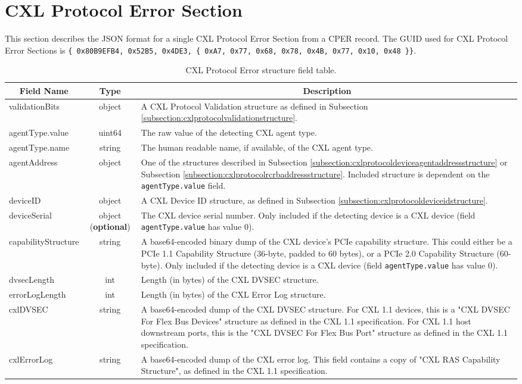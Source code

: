 \documentclass{report}
\newcommand*{\thead}[1]{\multicolumn{1}{|c|}{\bfseries #1}}
\newcommand*{\jsontable}[1]{
    \begin{table}[!ht]
    \label{#1}
    \centering
    \begin{adjustbox}{center}
    \begin{tabular}{|l|c|p{8cm}|}
    \hline
    \thead{Field Name} & \thead{Type} & \thead{Description} \\
    \hline
}
\newcommand*{\jsontableend}[1]{
    \hline
    \end{tabular}
    \end{adjustbox}
    \caption{#1}
    \label{table:#1}
    \end{table}
    \FloatBarrier
}
\begin{document}
\section{CXL Protocol Error Section}
\label{section:cxlprotocolerrorsection}
This section describes the JSON format for a single CXL Protocol Error Section from a CPER record. The GUID used for CXL Protocol Error Sections is \texttt{\{ 0x80B9EFB4, 0x52B5, 0x4DE3, \{ 0xA7, 0x77, 0x68, 0x78, 0x4B, 0x77, 0x10, 0x48 \}\}}.
\jsontable{table:cxlprotocolerrorsection}
validationBits & object & A CXL Protocol Validation structure as defined in Subsection \ref{subsection:cxlprotocolvalidationstructure}.\\
\hline
agentType.value & uint64 & The raw value of the detecting CXL agent type.\\
agentType.name & string & The human readable name, if available, of the CXL agent type.\\
\hline
agentAddress & object & One of the structures described in Subsection \ref{subsection:cxlprotocoldeviceagentaddressstructure} or Subsection \ref{subsection:cxlprotocolrcrbaddressstructure}. Included structure is dependent on the \texttt{agentType.value} field.\\
\hline
deviceID & object & A CXL Device ID structure, as defined in Subsection \ref{subsection:cxlprotocoldeviceidstructure}.\\
\hline
deviceSerial & object (\textbf{optional}) & The CXL device serial number. Only included if the detecting device is a CXL device (field \texttt{agentType.value} has value 0).\\
\hline
capabilityStructure & string & A base64-encoded binary dump of the CXL device's PCIe capability structure. This could either be a PCIe 1.1 Capability Structure (36-byte, padded to 60 bytes), or a PCIe 2.0 Capability Structure (60-byte). Only included if the detecting device is a CXL device (field \texttt{agentType.value} has value 0).\\
\hline
dvsecLength & int & Length (in bytes) of the CXL DVSEC structure.\\
\hline
errorLogLength & int & Length (in bytes) of the CXL Error Log structure.\\
\hline
cxlDVSEC & string & A base64-encoded dump of the CXL DVSEC structure. For CXL 1.1 devices, this is a "CXL DVSEC For Flex Bus Devices" structure as defined in the CXL 1.1 specification. For CXL 1.1 host downstream ports, this is the "CXL DVSEC For Flex Bus Port" structure as defined in the CXL 1.1 specification.\\
\hline
cxlErrorLog & string & A base64-encoded dump of the CXL error log. This field contains a copy of "CXL RAS Capability Structure", as defined in the CXL 1.1 specification.\\
\jsontableend{CXL Protocol Error structure field table.}
\end{document}
